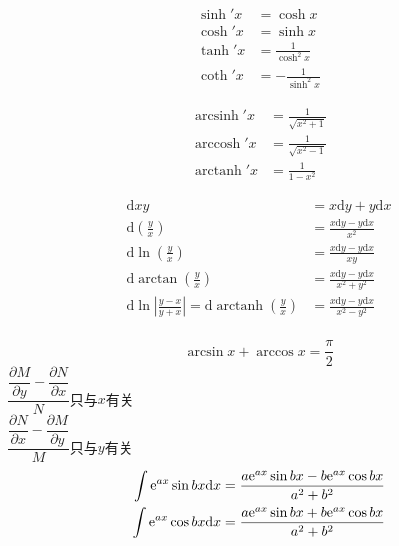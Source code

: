 \documentclass{article}
\DeclareMathOperator{\arccosh}{arccosh}
\DeclareMathOperator{\arcsinh}{arcsinh}
\DeclareMathOperator{\arctanh}{arctanh}
\begin{document}
\begin{align*}
    \sinh' x & = \cosh x                \\
    \cosh' x & = \sinh x                \\
    \tanh' x & = \frac{1}{\cosh^{2}x}   \\
    \coth' x & =- \frac{1}{\sinh^{2} x}
\end{align*}

\begin{align*}
    \arcsinh' x & =\frac{1}{\sqrt{x^{2}+1}} \\
    \arccosh' x & =\frac{1}{\sqrt{x^{2}-1}} \\
    \arctanh' x & =\frac{1}{1-x^{2}}
\end{align*}

\begin{align*}
    \mathrm{d} xy
    & =x\mathrm{d}y+y\mathrm{d}x                     \\
    \mathrm{d} \left( \frac{y}{x} \right)
    & =\frac{x\mathrm{d}y-y\mathrm{d}x}{x^{2}}       \\
    \mathrm{d} \ln \left( \frac{y}{x} \right)
    & =\frac{x\mathrm{d}y-y\mathrm{d}x}{xy}          \\
    \mathrm{d} \arctan \left( \frac{y}{x} \right)
    & =\frac{x\mathrm{d}y-y\mathrm{d}x}{x^{2}+y^{2}} \\
    \mathrm{d} \ln \left| \frac{y - x}{y + x} \right|=\mathrm{d}
    \arctanh \left( \frac{y}{x} \right) &
    =\frac{x\mathrm{d}y-y\mathrm{d}x}{x^{2}-y^{2}} \\
\end{align*}

\[\arcsin x +\arccos x =\frac{\pi}{2} \]
\(\dfrac{\dfrac{\partial M}{\partial y} - \dfrac{\partial N}{\partial
x}}{N}\)只与\(x\)有关 \\
\(\dfrac{\dfrac{\partial N}{\partial x} - \dfrac{\partial M}{\partial
y}}{M}\)只与\(y\)有关 \\

\begin{align*}
    \int \mathrm{e}^{ax} \sin bx \mathrm{d}x & =\frac{a\mathrm{e}^{ax} \sin bx -
    b\mathrm{e}^{ax}\cos bx}{a^{2}+b^{2}} \\
    \int \mathrm{e}^{ax} \cos bx \mathrm{d}x & =\frac{a\mathrm{e}^{ax} \sin bx +
    b\mathrm{e}^{ax}\cos bx}{a^{2}+b^{2}} \\
\end{align*}
\end{document}
